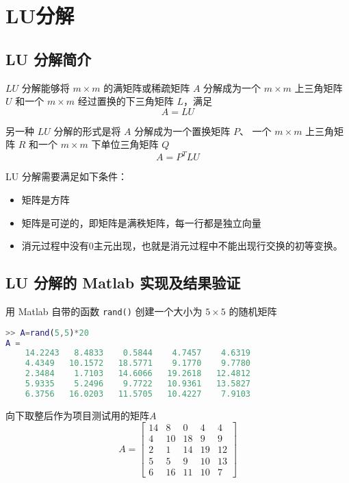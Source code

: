 \chapter{LU分解}
\section{LU 分解简介}
$LU$ 分解能够将 $m\times m$ 的满矩阵或稀疏矩阵 $A$ 分解成为一个 $m\times m$ 上三角矩阵 $U$ 和一个 $m\times m$ 经过置换的下三角矩阵 $L$，满足
\begin{equation}
    A = LU
    \label{LU-decomposition}
\end{equation}

另一种 $LU$ 分解的形式是将 $A$ 分解成为一个置换矩阵 $P$、 一个 $m\times m$ 上三角矩阵 $R$ 和一个 $m\times m$ 下单位三角矩阵 $Q$
\begin{equation}
    A = P^TLU
    \label{QRP-decomposition}
\end{equation}

LU 分解需要满足如下条件：
\begin{itemize}
    \item 矩阵是方阵
    \item 矩阵是可逆的，即矩阵是满秩矩阵，每一行都是独立向量
    \item 消元过程中没有0主元出现，也就是消元过程中不能出现行交换的初等变换。
\end{itemize}

\section{LU 分解的 Matlab 实现及结果验证}
用 Matlab 自带的函数 \lstinline|rand()| 创建一个大小为 $5\times 5$ 的随机矩阵


\begin{lstlisting}[language=Matlab]  
>> A=rand(5,5)*20
A =
    14.2243   8.4833    0.5844    4.7457    4.6319
    4.4349   10.1572   18.5771    9.1770    9.7780
    2.3484    1.7103   14.6066   19.2618   12.4812
    5.9335    5.2496    9.7722   10.9361   13.5827
    6.3756   16.0203   11.5705   10.4227    7.9103
\end{lstlisting}


向下取整后作为项目测试用的矩阵$A$
\begin{equation}
    A=\begin{bmatrix}
        14 & 8  & 0  & 4  & 4  \\
        4  & 10 & 18 & 9  & 9  \\
        2  & 1  & 14 & 19 & 12 \\
        5  & 5  & 9  & 10 & 13 \\
        6  & 16 & 11 & 10 & 7
    \end{bmatrix}
\end{equation}


